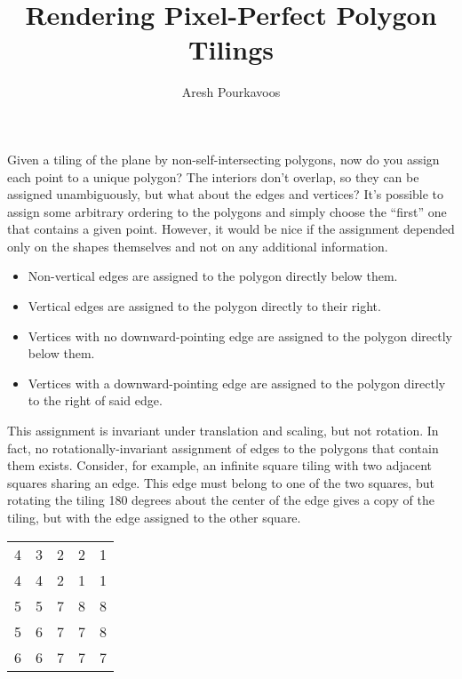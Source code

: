 \documentclass{article}
\begin{document}
\title{Rendering Pixel-Perfect Polygon Tilings}
\author{Aresh Pourkavoos}
\maketitle

Given a tiling of the plane by non-self-intersecting polygons,
now do you assign each point to a unique polygon?
The interiors don't overlap, so they can be assigned unambiguously,
but what about the edges and vertices?
It's possible to assign some arbitrary ordering to the polygons
and simply choose the ``first'' one that contains a given point.
However, it would be nice if the assignment
depended only on the shapes themselves
and not on any additional information.
\begin{itemize}
\item
  Non-vertical edges are assigned to the polygon directly below them.
\item
  Vertical edges are assigned to the polygon directly to their right.
\item
  Vertices with no downward-pointing edge are assigned to the polygon directly below them.
\item
  Vertices with a downward-pointing edge are assigned to the polygon directly to the right of said edge.
\end{itemize}
This assignment is invariant under translation and scaling, but not rotation.
In fact, no rotationally-invariant assignment of edges to the polygons that contain them exists.
Consider, for example, an infinite square tiling
with two adjacent squares sharing an edge.
This edge must belong to one of the two squares,
but rotating the tiling 180 degrees about the center of the edge
gives a copy of the tiling, but with the edge assigned to the other square.
\begin{center}
  \begin{tabular}{|c c c c c|}
    \hline
    4 & 3 & 2 & 2 & 1 \\
    4 & 4 & 2 & 1 & 1 \\
    5 & 5 & 7 & 8 & 8 \\
    5 & 6 & 7 & 7 & 8 \\
    6 & 6 & 7 & 7 & 7 \\ \hline
  \end{tabular}
\end{center}
\end{document}
